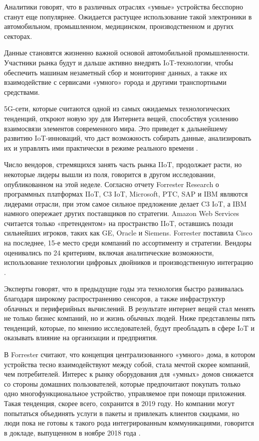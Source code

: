 Аналитики говорят, что в различных отраслях «умные» устройства бесспорно станут еще популярнее. Ожидается растущее использование такой электроники в автомобильном, промышленном, медицинском, производственном и других секторах.

Данные становятся жизненно важной основой автомобильной промышленности. Участники рынка будут и дальше активно внедрять IoT-технологии, чтобы обеспечить машинам незаметный сбор и мониторинг данных, а также их взаимодействие с сервисами «умного» города и другими транспортными средствами.

5G-сети, которые считаются одной из самых ожидаемых технологических тенденций, откроют новую эру для Интернета вещей, способствуя усилению взаимосвязи элементов современного мира. Это приведет к дальнейшему развитию IoT-инноваций, что даст возможность собирать данные, анализировать их и управлять ими практически в режиме реального времени \cite{iot_data_2019}.

Число вендоров, стремящихся занять часть рынка IIoT, продолжает расти, но некоторые лидеры вышли из поля, говорится в другом исследовании, опубликованном на этой неделе. Согласно отчету Forrester Research о программных платформах IIoT, C3 IoT, Microsoft, PTC, SAP и IBM являются лидерами отрасли, при этом самое сильное предложение делает C3 IoT, а IBM намного опережает других поставщиков по стратегии. Amazon Web Services считается только «претендентом» на пространство IIoT, оставшись позади сильнейших игроков, таких как GE, Oracle и Siemens. Forrester поставила Cisco на последнее, 15-е место среди компаний по ассортименту и стратегии. Вендоры оценивались по 24 критериям, включая аналитические возможности, использование технологии цифровых двойников и производственную интеграцию \cite{iot_data_2019}.

Эксперты говорят, что в предыдущие годы эта технология быстро развивалась благодаря широкому распространению сенсоров, а также инфраструктур облачных и периферийных вычислений. В результате интернет вещей стал менять не только бизнес компаний, но и жизнь обычных людей. Ниже представлены пять тенденций, которые, по мнению исследователей, будут преобладать в сфере IoT и оказывать влияние на организации и предприятия.

В Forrester считают, что концепция централизованного «умного» дома, в котором устройства тесно взаимодействуют между собой, стала мечтой скорее компаний, чем потребителей. Интерес к рынку оборудования для «умных» домов снижается со стороны домашних пользователей, которые предпочитают покупать только одно многофункциональное устройство, управляемое при помощи приложения. Такая тенденция, скорее всего, сохранится в 2019 году. Но компании могут попытаться объединять услуги в пакеты и привлекать клиентов скидками, но люди пока не готовы к такого рода интегрированным коммуникациями, говорится в докладе, выпущенном в ноябре 2018 года \cite{iot_data_2019}.

